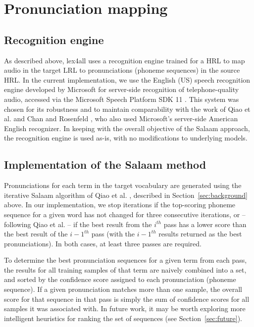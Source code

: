 \documentclass[11pt]{article}
\begin{document}
\section{Pronunciation mapping}
\label{sec:backend}

\subsection{Recognition engine}
\label{sec:engine}
As described above, lex4all uses a recognition engine trained for a HRL to map audio in the target LRL to pronunciations (phoneme sequences) in the source HRL. In the current implementation, we use the English (US) speech recognition engine developed by Microsoft for server-side recognition of telephone-quality audio, accessed via the Microsoft Speech Platform SDK 11 \cite{mspsdk}. This system was chosen for its robustness and to maintain comparability with the work of Qiao et al.  and Chan and Rosenfeld , who also used Microsoft's server-side American English recognizer. In keeping with the overall objective of the Salaam approach, the recognition engine is used as-is, with no modifications to underlying models. 


\subsection{Implementation of the Salaam method}
\label{sec:implementation}

Pronunciations for each term in the target vocabulary are generated using the iterative Salaam algorithm of Qiao et al. , described in Section~\ref{sec:background} above. In our implementation, 
we stop iterations
if the top-scoring phoneme sequence for a given word has not changed for three consecutive iterations, or -- following Qiao et al.  --  if the best result from the $i^{th}$ pass has a lower score than the best result of the ${i - 1}^{th}$ pass (with the ${i - 1}^{th}$ results returned as the best pronunciations). In both cases, at least three passes are required. 

To determine the best pronunciation sequences for a given term from each pass, the results for all training samples of that term are naively combined into a set, and sorted by the confidence score assigned to each pronunciation (phoneme sequence). If a given pronunciation matches more than one sample, the overall score for that sequence in that pass is simply the sum of confidence scores for all samples it was associated with. In future work, it may be worth exploring more intelligent heuristics for ranking the set of sequences (see Section~\ref{sec:future}).
\end{document}
